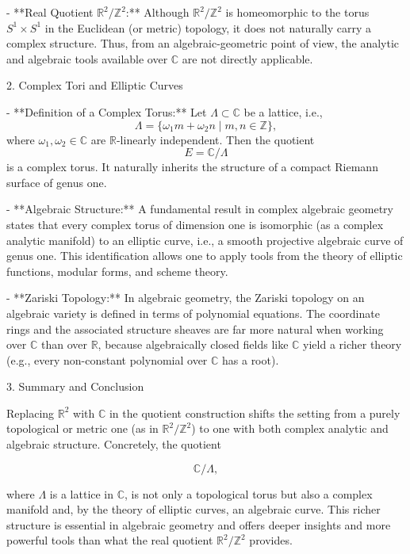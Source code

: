 \documentclass[11pt,openany]{article}
\begin{document}
- **Real Quotient \(\mathbb{R}^2/\mathbb{Z}^2\):**  
Although \(\mathbb{R}^2/\mathbb{Z}^2\) is homeomorphic to the torus \(S^1 \times S^1\) in the Euclidean (or metric) topology, it does not naturally carry a complex structure. Thus, from an algebraic-geometric point of view, the analytic and algebraic tools available over \(\mathbb{C}\) are not directly applicable.

2. Complex Tori and Elliptic Curves

- **Definition of a Complex Torus:**  
Let \(\Lambda \subset \mathbb{C}\) be a lattice, i.e.,
\[
\Lambda = \{ \omega_1 m + \omega_2 n \mid m, n \in \mathbb{Z} \},
\]
where \(\omega_1, \omega_2 \in \mathbb{C}\) are \(\mathbb{R}\)-linearly independent. Then the quotient
\[
E = \mathbb{C}/\Lambda
\]
is a complex torus. It naturally inherits the structure of a compact Riemann surface of genus one.

- **Algebraic Structure:**  
A fundamental result in complex algebraic geometry states that every complex torus of dimension one is isomorphic (as a complex analytic manifold) to an elliptic curve, i.e., a smooth projective algebraic curve of genus one. This identification allows one to apply tools from the theory of elliptic functions, modular forms, and scheme theory.

- **Zariski Topology:**  
In algebraic geometry, the Zariski topology on an algebraic variety is defined in terms of polynomial equations. The coordinate rings and the associated structure sheaves are far more natural when working over \(\mathbb{C}\) than over \(\mathbb{R}\), because algebraically closed fields like \(\mathbb{C}\) yield a richer theory (e.g., every non-constant polynomial over \(\mathbb{C}\) has a root).

3. Summary and Conclusion

Replacing \(\mathbb{R}^2\) with \(\mathbb{C}\) in the quotient construction shifts the setting from a purely topological or metric one (as in \(\mathbb{R}^2/\mathbb{Z}^2\)) to one with both complex analytic and algebraic structure. Concretely, the quotient

\[
\mathbb{C}/\Lambda,
\]

where \(\Lambda\) is a lattice in \(\mathbb{C}\), is not only a topological torus but also a complex manifold and, by the theory of elliptic curves, an algebraic curve. This richer structure is essential in algebraic geometry and offers deeper insights and more powerful tools than what the real quotient \(\mathbb{R}^2/\mathbb{Z}^2\) provides.
\end{document}
